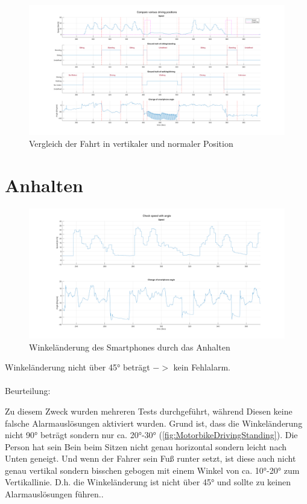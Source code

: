 \begin{figure}[H]
	\centering
	\includegraphics[width=\linewidth]{Bilder/Speed_Groundtruth_WalkStand_Compare.png}
	\caption{Vergleich der Fahrt in vertikaler und normaler Position}
	\label{fig:Speed_Groundtruth_WalkStand_Compare}
\end{figure}

\section{Anhalten}

\begin{figure}[H]
	\centering
	\includegraphics[width=\linewidth]{Bilder/Speed_AngleChangeCompare.png}
	\caption{Winkeländerung des Smartphones durch das Anhalten}
	\label{fig:Speed_AngleChangeCompare}
\end{figure}
Winkeländerung nicht über \ang{45} beträgt $->$ kein Fehlalarm.\\
\\
Beurteilung:

Zu diesem Zweck wurden mehreren Tests durchgeführt, während Diesen keine falsche Alarmauslösungen aktiviert wurden. Grund ist, dass die Winkeländerung nicht \ang{90} beträgt sondern nur ca. \ang{20}-\ang{30} (\autoref{fig:MotorbikeDrivingStanding}). Die Person hat sein Bein beim Sitzen nicht genau horizontal sondern leicht nach Unten geneigt. Und wenn der Fahrer sein Fuß runter setzt, ist diese auch nicht genau vertikal sondern bisschen gebogen mit einem Winkel von ca. \ang{10}-\ang{20} zum Vertikallinie. D.h. die Winkeländerung ist nicht über \ang{45} und sollte zu keinen Alarmauslösungen führen..

